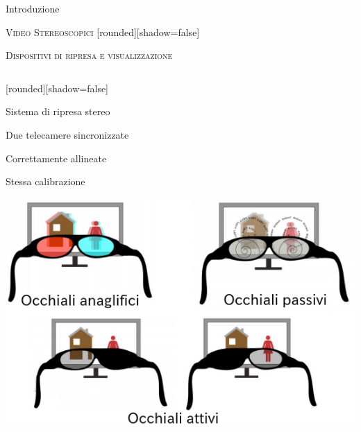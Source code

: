 \documentclass{beamer}
\begin{document}
\begin{section}{Introduzione}
\begin{frame}[t]{\textsc{Video Stereoscopici}}
	[rounded][shadow=false]
		\vspace{-0.5em}
\begin{block}
\end{block} 
	\vspace{0.5em}
\begin{center}
\end{center}
\end{frame}


\begin{frame}[t]{\textsc{Dispositivi di ripresa e visualizzazione}}
\vspace{-0.3em}
\begin{columns}
\begin{column}{5cm}
\begin{center}
[rounded][shadow=false]
\begin{block}{Sistema di ripresa stereo}
		\begin{itemize}
			\item  \small{Due telecamere sincronizzate
			\item Correttamente allineate
			\item Stessa calibrazione}
		\end{itemize}	
	\end{block}
\end{center}
\centering
\includegraphics[width=1\linewidth]{./img/display.png}
\end{column}


\end{columns}
\end{frame}
\end{section}
\end{document}
